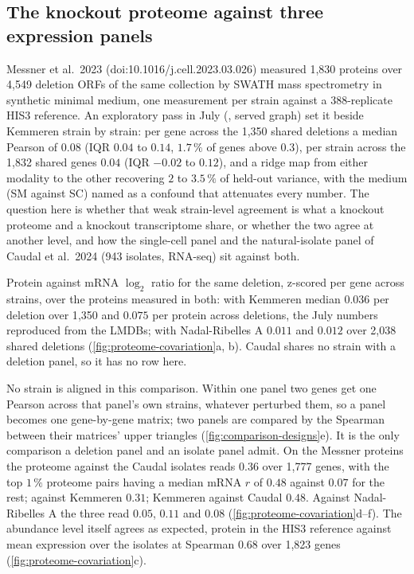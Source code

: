 \subsection{The knockout proteome against three expression panels}
\label{sec:readouts-proteome}

Messner et al.\ 2023 (doi:10.1016/j.cell.2023.03.026) measured 1{,}830 proteins over
4{,}549 deletion ORFs of the same collection by SWATH mass spectrometry in synthetic
minimal medium, one measurement per strain against a 388-replicate HIS3 reference. An
exploratory pass in July (, served graph) set it
beside Kemmeren strain by strain: per gene across the 1{,}350 shared deletions a median
Pearson of $0.08$ (IQR $0.04$ to $0.14$, $1.7\,\%$ of genes above $0.3$), per strain
across the 1{,}832 shared genes $0.04$ (IQR $-0.02$ to $0.12$), and a ridge map from
either modality to the other recovering $2$ to $3.5\,\%$ of held-out variance, with the
medium (SM against SC) named as a confound that attenuates every number. The question
here is whether that weak strain-level agreement is what a knockout proteome and a
knockout transcriptome share, or whether the two agree at another level, and how the
single-cell panel and the natural-isolate panel of Caudal et al.\ 2024 (943 isolates,
RNA-seq) sit against both.

 Protein against mRNA $\log_2$ ratio for the same deletion,
z-scored per gene across strains, over the proteins measured in both: with Kemmeren
median $0.036$ per deletion over 1{,}350 and $0.075$ per protein across deletions, the
July numbers reproduced from the LMDBs; with Nadal-Ribelles A $0.011$ and $0.012$ over
2{,}038 shared deletions (\cref{fig:proteome-covariation}a, b). Caudal shares no strain
with a deletion panel, so it has no row here.

 No strain is aligned in this comparison. Within one panel two
genes get one Pearson across that panel's own strains, whatever perturbed them, so a
panel becomes one gene-by-gene matrix; two panels are compared by the Spearman between
their matrices' upper triangles (\cref{fig:comparison-designs}e). It is the only
comparison a deletion panel and an isolate panel admit. On the Messner proteins the
proteome against the Caudal isolates reads $0.36$ over 1{,}777 genes, with the top
$1\,\%$ proteome pairs having a median mRNA $r$ of $0.48$ against $0.07$ for the rest;
against Kemmeren $0.31$; Kemmeren against Caudal $0.48$. Against Nadal-Ribelles A the
three read $0.05$, $0.11$ and $0.08$ (\cref{fig:proteome-covariation}d--f). The
abundance level itself agrees as expected, protein in the HIS3 reference against mean
expression over the isolates at Spearman $0.68$ over 1{,}823 genes
(\cref{fig:proteome-covariation}c).

